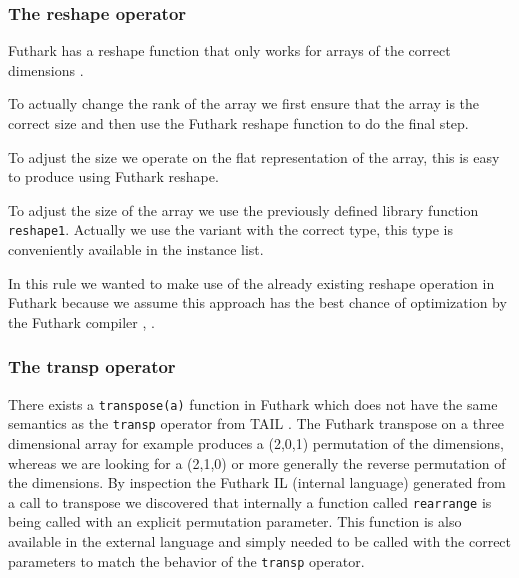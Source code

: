 \documentclass[11pt]{article}
\begin{document}
\subsubsection{The reshape operator} 
Futhark has a reshape function that only works for arrays of the correct dimensions \cite{TroelsHenriksen}.

To actually change the rank of the array we first ensure that the array is the correct size and then use the Futhark reshape
function to do the final step.

To adjust the size we operate on the flat representation of the array, this is easy to produce using Futhark reshape.

To adjust the size of the array we use the previously defined library function {\tt reshape1}. Actually we use the variant with
the correct type, this type is conveniently available in the instance list.

In this rule we wanted to make use of the already existing reshape operation in Futhark because we assume this approach has the best
chance of optimization by the Futhark compiler\cite{TroelsHenriksen} \cite{T2graph}, \cite{Hybrid}.

\subsubsection{The transp operator} 
There exists a {\tt transpose(a)} function in Futhark which does not have the same semantics as the {\tt transp} operator from TAIL \cite{TroelsHenriksen}\cite{ElsmanDybdal:Array:2014}.
The Futhark transpose on a three dimensional array for example produces a (2,0,1) permutation of the dimensions, whereas we are
looking for a (2,1,0) or more generally the reverse permutation of the dimensions.
By inspection the Futhark IL (internal language) generated from a call to transpose we discovered that internally a function called {\tt rearrange} is being called with an explicit permutation parameter.
This function is also available in the external language and simply needed to be called with the correct parameters to match the behavior of the {\tt transp} operator.
\end{document}
